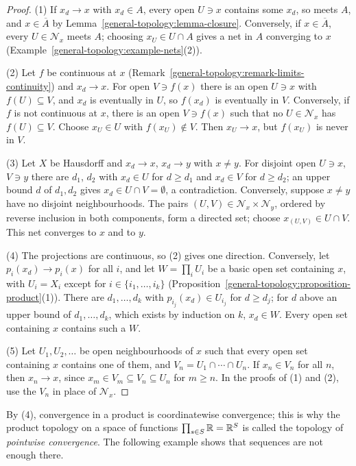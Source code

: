 \begin{proof}
(1) If $x_d \to x$ with $x_d \in A$, every open $U \ni x$ contains some $x_d$, so meets $A$, and $x \in \overline{A}$ by Lemma~\ref{general-topology:lemma-closure}. Conversely, if $x \in \overline{A}$, every
$U \in \mathcal{N}_x$ meets $A$; choosing $x_U \in U \cap A$ gives a net in $A$ converging to $x$ (Example~\ref{general-topology:example-nets}(2)).

(2) Let $f$ be continuous at $x$ (Remark~\ref{general-topology:remark-limits-continuity}) and $x_d \to x$. For open $V \ni f(x)$ there is an open $U \ni x$ with $f(U) \subseteq V$, and $x_d$ is eventually in
$U$, so $f(x_d)$ is eventually in $V$. Conversely, if $f$ is not continuous at $x$, there is an open $V \ni f(x)$ such that no $U \in \mathcal{N}_x$ has $f(U) \subseteq V$. Choose $x_U \in U$ with
$f(x_U) \notin V$. Then $x_U \to x$, but $f(x_U)$ is never in $V$.

(3) Let $X$ be Hausdorff and $x_d \to x$, $x_d \to y$ with $x \neq y$. For disjoint open $U \ni x$, $V \ni y$ there are $d_1$, $d_2$ with $x_d \in U$ for $d \geq d_1$ and $x_d \in V$ for $d \geq d_2$; an
upper bound $d$ of $d_1, d_2$ gives $x_d \in U \cap V = \emptyset$, a contradiction. Conversely, suppose $x \neq y$ have no disjoint neighbourhoods. The pairs $(U, V) \in \mathcal{N}_x \times \mathcal{N}_y$,
ordered by reverse inclusion in both components, form a directed set; choose $x_{(U, V)} \in U \cap V$. This net converges to $x$ and to $y$.

(4) The projections are continuous, so (2) gives one direction. Conversely, let $p_i(x_d) \to p_i(x)$ for all $i$, and let $W = \prod_iU_i$ be a basic open set containing $x$, with $U_i = X_i$ except for
$i \in \{i_1, \ldots, i_k\}$ (Proposition~\ref{general-topology:proposition-product}(1)). There are $d_1, \ldots, d_k$ with $p_{i_j}(x_d) \in U_{i_j}$ for $d \geq d_j$; for $d$ above an upper bound of
$d_1, \ldots, d_k$, which exists by induction on $k$, $x_d \in W$. Every open set containing $x$ contains such a $W$.

(5) Let $U_1, U_2, \ldots$ be open neighbourhoods of $x$ such that every open set containing $x$ contains one of them, and $V_n = U_1 \cap \cdots \cap U_n$. If $x_n \in V_n$ for all $n$, then
$x_n \to x$, since $x_m \in V_m \subseteq V_n \subseteq U_n$ for $m \geq n$. In the proofs of (1) and (2), use the $V_n$ in place of $\mathcal{N}_x$.
\end{proof}

By (4), convergence in a product is coordinatewise convergence; this is why the product topology on a space of functions $\prod_{s \in S}\mathbb{R} = \mathbb{R}^S$ is called the topology of
\emph{pointwise convergence}. The following example shows that sequences are not enough there.

